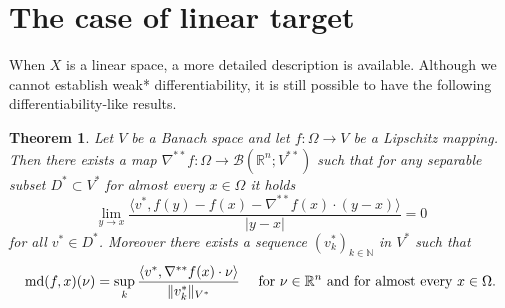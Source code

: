 \documentclass[reqno]{amsart}
\newtheorem{thm}{Theorem}[section]
\begin{document}
\section{The case of linear target}\label{sec5}
When $X$ is a linear space, a more detailed description is available.
Although we cannot establish weak* differentiability, it is still possible to have the following differentiability-like results.

\begin{thm}\label{thm:Vtarget}
Let $V$ be a Banach space and let $f:\Omega\to V$ be a Lipschitz mapping.
Then there exists a map $\nabla^{**}f :\Omega \to \mathcal B(\mathbb R^n; V^{**})$
such that for any separable subset $D^*\subset V^*$ for almost every $x\in\Omega$
it holds 
\begin{equation}\label{eq:diffV}
\lim_{y\to x} \frac{\langle v^*, f(y) - f(x) - \nabla^{**}f(x)\cdot(y-x)\rangle}{|y-x|} = 0
\end{equation}
for all $v^*\in D^*$. 
Moreover there exists a sequence $(v^*_k)_{k\in\mathbb N}$ in $V^*$ such that
\[
\textnormal{md}(f, x)(\nu) = \sup_k\frac{\langle v^*, \nabla^{**}f(x)\cdot\nu\rangle}{\|v^*_k\|_{V^*}}  \quad \text{ for } \nu\in\mathbb R^n \textnormal{ and for almost every } x\in\Omega.
\] 
\end{thm}
\end{document}
